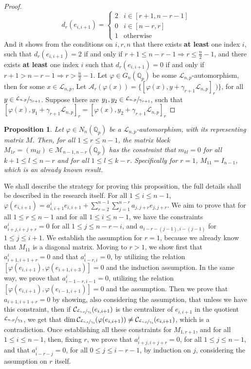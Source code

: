 \documentclass[12pt]{article}
\newtheorem{proposition}[theorem]{Proposition}
\begin{document}
\begin{proof}
\[
    d_{r}(e_{i,i+1})=
    \begin{cases}
        2 & i\in[r+1,n-r-1] \\
        0 & i\in[n-r,r] \\
        1 & \mathrm{otherwise}
    \end{cases}
\]
And it shows from the conditions on $i,r,n$ that there exists \textbf{at least} one index $i$, such that $d_{r}(e_{i,i+1})=2$ if and only if $r+1\leq{n-r-1}\Rightarrow{r\leq{\frac{n}{2}-1}}$, and there exists \textbf{at least} one index $i$ such that $d_{r}(e_{i,i+1})=0$ if and only if $r+1>{n-r-1}\Rightarrow{r>{\frac{n}{2}-1}}$. Let $\varphi\in{G_{n}(\mathbb{Q}_{p})}$ be some $\mathcal{L}_{n,p}$-automorphism, then for some $x\in\mathcal{L}_{n,p}$, Let $\mathcal{A}_{r}(\varphi(x))=\{[\varphi(x),y+\gamma_{r+1}\mathcal{L}_{n,p}]_{r})\}$, for all $y\in\sfrac{\mathcal{L}_{n,p}}{\gamma_{r+1}}$. Suppose there are $y_{1},y_{2}\in\sfrac{\mathcal{L}_{n,p}}{\gamma_{r+1}}$, such that $[\varphi(x),y_{1}+\gamma_{r+1}\mathcal{L}_{n,p}]_{r}=[\varphi(x),y_{2}+\gamma_{r+1}\mathcal{L}_{n,p}]_{r}$
\end{proof}
\begin{proposition}
Let $\varphi\in{N_n(\mathbb{Q}_p)}$ be a $\mathcal{L}_{n,p}$-automorphism, with its representing matrix $M$. Then, for all $1\leq{r}\leq{n-1}$, the matrix block $M_{1r}=(m_{kl})\in\mathcal{M}_{n-1,n-r}(\mathbb{Q}_p)$ has the constraint that $m_{kl}=0$ for all ${k+1}\leq{l}\leq{n-r}$ and for all $1\leq{l}\leq{k-r}$. Specifically for $r=1$, $M_{11}=I_{n-1}$, which is an already known result.
\end{proposition}
We shall describe the strategy for proving this proposition, the full details shall be described in the research itself. For all $1\leq{i}\leq{n-1}$, $\varphi(e_{i,i+1})=a_{i,i+1}^{i}e_{i,i+1}+\sum_{r=2}^{n-1}\sum_{j=1}^{n-r}a_{j,j+r}e_{j,j+r}$. We aim to prove that for all $1\leq{r}\leq{n-1}$ and for all $1\leq{i}\leq{n-1}$, we have the constraints $a_{i+j,i+j+r}^{i}=0$ for all $1\leq{j}\leq{n-r-i}$, and $a_{i-r-(j-1),i-(j-1)}$ for $1\leq{j}\leq {i+1}$. We establish the assumption for $r=1$, because we already know that $M_{11}$ is a diagonal matrix. Moving to $r>1$, we show first that $a_{i+1,i+1+r}^{i}=0$ and that $a_{i-r,i}^{i}=0$, by utilizing the relation $[\varphi(e_{i,i+1}),\varphi(e_{i+1,i+3})]=0$ and the induction assumption.
In the same way, we prove that $a_{i-1-r,i-1}^{i}=0$, utilizing the relation $[\varphi(e_{i,i+1}),\varphi(e_{i-1,i+1})]=0$ and the assumption.
Then we prove that $a_{i+1,i+1+r}=0$ by showing, also considering the assumption, that unless we have this constraint, then if $\mathcal{C}_{\sfrac{\mathcal{L}_{n,p}}{\gamma_3}}(e_{i,i+1})$ is the centralizer of $e_{i,i+1}$ in the quotient $\sfrac{\mathcal{L}_{n,p}}{\gamma_3}$, we get that $\dim\mathcal{C}_{\sfrac{\mathcal{L}_{n,p}}{\gamma_3}}(\varphi(e_{i,i+1}))\neq\mathcal{C}_{\sfrac{\mathcal{L}_{n,p}}{\gamma_3}}(e_{i,i+1})$, which is a contradiction. Once establishing all these constraints for $M_{1,r+1}$, and for all $1\leq{i}\leq{n-1}$, then, fixing $r$, we prove that $a_{i+j,i+j+r}^{i}=0$, for all $1\leq{j}\leq{n-1}$, and that $a_{i-r-j}^{i}=0$, for all $0\leq{j}\leq{i-r-1}$, by induction on $j$, considering the assumption on $r$ itself.
\end{document}
